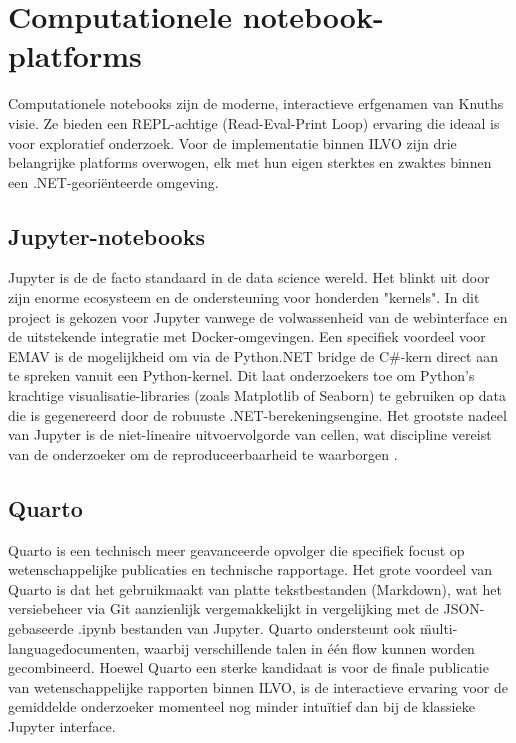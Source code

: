 \section{Computationele notebook-platforms}
Computationele notebooks zijn de moderne, interactieve erfgenamen van Knuths visie. Ze bieden een REPL-achtige (Read-Eval-Print Loop) ervaring die ideaal is voor exploratief onderzoek. Voor de implementatie binnen ILVO zijn drie belangrijke platforms overwogen, elk met hun eigen sterktes en zwaktes binnen een .NET-geori\"enteerde omgeving.

\subsection{Jupyter-notebooks}
Jupyter \autocite{jupyternotebook} is de de facto standaard in de data science wereld. Het blinkt uit door zijn enorme ecosysteem en de ondersteuning voor honderden "kernels". In dit project is gekozen voor Jupyter vanwege de volwassenheid van de webinterface en de uitstekende integratie met Docker-omgevingen. 
Een specifiek voordeel voor EMAV is de mogelijkheid om via de Python.NET bridge de C\#-kern direct aan te spreken vanuit een Python-kernel. Dit laat onderzoekers toe om Python's krachtige visualisatie-libraries (zoals Matplotlib of Seaborn) te gebruiken op data die is gegenereerd door de robuuste .NET-berekeningsengine. Het grootste nadeel van Jupyter is de niet-lineaire uitvoervolgorde van cellen, wat discipline vereist van de onderzoeker om de reproduceerbaarheid te waarborgen \autocite{Rule2018}.

\subsection{Quarto}
Quarto \autocite{quarto2025} is een technisch meer geavanceerde opvolger die specifiek focust op wetenschappelijke publicaties en technische rapportage. Het grote voordeel van Quarto is dat het gebruikmaakt van platte tekstbestanden (Markdown), wat het versiebeheer via Git aanzienlijk vergemakkelijkt in vergelijking met de JSON-gebaseerde .ipynb bestanden van Jupyter. Quarto ondersteunt ook \"multi-language\" documenten, waarbij verschillende talen in \'e\'en flow kunnen worden gecombineerd. Hoewel Quarto een sterke kandidaat is voor de finale publicatie van wetenschappelijke rapporten binnen ILVO, is de interactieve ervaring voor de gemiddelde onderzoeker momenteel nog minder intu\"itief dan bij de klassieke Jupyter interface.

